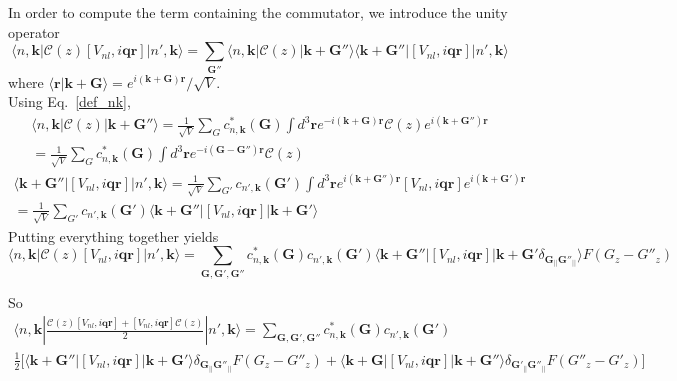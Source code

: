 \documentclass[a4paper,11pt]{report}
\renewcommand{\vec}[1]{\mathbf{#1}}
\newcommand{\bra}{\langle}
\newcommand{\ket}{\rangle}
\begin{document}
In order to compute the term containing the commutator, we introduce the unity operator
\begin{equation}
 \bra n,\vec{k}|\mathcal{C}(z)[V_{nl},i\vec{q}\vec{r}]|n',\vec{k}\ket = 
\sum_{\vec{G''}}\bra n,\vec{k}|\mathcal{C}(z)|\vec{k}+\vec{G''}\ket\bra\vec{k}+\vec{G''}| [V_{nl},i\vec{q}\vec{r}]|n',\vec{k}\ket
\end{equation}
where $\bra \vec{r} |\vec{k}+\vec{G}\ket = e^{i(\vec{k}+\vec{G})\vec{r}}/\sqrt{V}$.\\
Using Eq.~\ref{def_nk}, 
\begin{eqnarray}
 \bra n,\vec{k}|\mathcal{C}(z)|\vec{k}+\vec{G''}\ket = \frac{1}{\sqrt{V}} \sum_{G} c^*_{n,\vec{k}}(\vec{G}) \int d^3\vec{r} e^{-i(\vec{k}+\vec{G})\vec{r}} \mathcal{C}(z)e^{i(\vec{k}+\vec{G''})\vec{r}}\nonumber\\
= \frac{1}{\sqrt{V}} \sum_{G} c^*_{n,\vec{k}}(\vec{G})\int d^3\vec{r} e^{-i(\vec{G}-\vec{G''})\vec{r}} \mathcal{C}(z) 
\end{eqnarray}
\begin{eqnarray}
 \bra\vec{k}+\vec{G''}| [V_{nl},i\vec{q}\vec{r}]|n',\vec{k}\ket = \frac{1}{\sqrt{V}} \sum_{G'} c_{n',\vec{k}}(\vec{G'})\int d^3\vec{r} e^{i(\vec{k}+\vec{G''})\vec{r}} [V_{nl},i\vec{q}\vec{r}] e^{i(\vec{k}+\vec{G'})\vec{r}} \nonumber\\
= \frac{1}{\sqrt{V}} \sum_{G'} c_{n',\vec{k}}(\vec{G'}) \bra \vec{k}+\vec{G''}| [V_{nl},i\vec{q}\vec{r}]|\vec{k}+\vec{G'}\ket
\end{eqnarray}
Putting everything together yields
\begin{equation}
 \bra n,\vec{k}|\mathcal{C}(z)[V_{nl},i\vec{q}\vec{r}]|n',\vec{k}\ket = 
\sum_{\vec{G},\vec{G'},\vec{G''}} c^*_{n,\vec{k}}(\vec{G})c_{n',\vec{k}}(\vec{G'}) \bra \vec{k}+\vec{G''}| [V_{nl},i\vec{q}\vec{r}]|\vec{k}+\vec{G'}\delta_{\vec{G}_{||}\vec{G''}_{||}} \ket F(G_z-G''_z)
\end{equation}

So 
\begin{eqnarray}
 \bra n,\vec{k}|\frac{\mathcal{C}(z)[V_{nl},i\vec{q}\vec{r}]+[V_{nl},i\vec{q}\vec{r}]\mathcal{C}(z)}{2}|n',\vec{k}\ket
= \sum_{\vec{G},\vec{G'},\vec{G''}} c^*_{n,\vec{k}}(\vec{G})c_{n',\vec{k}}(\vec{G'})\nonumber\\
\frac{1}{2}\Bigg[ \bra \vec{k}+\vec{G''}| [V_{nl},i\vec{q}\vec{r}]|\vec{k}+\vec{G'}\ket\delta_{\vec{G}_{||}\vec{G''}_{||}}  F(G_z-G''_z) + \bra \vec{k}+\vec{G}| [V_{nl},i\vec{q}\vec{r}]|\vec{k}+\vec{G''} \ket\delta_{\vec{G'}_{||}\vec{G''}_{||}} F(G''_z-G'_z) \Bigg]
\end{eqnarray}
\end{document}
